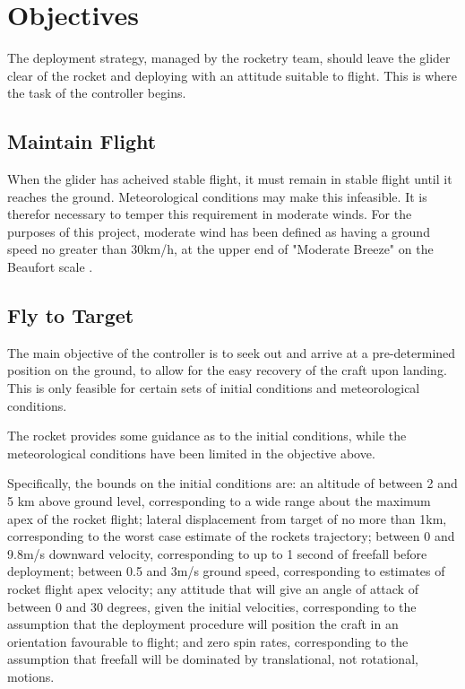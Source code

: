 \documentclass{sydeStyle}
\begin{document}
\chapter{Objectives}

The deployment strategy, managed by the rocketry team, should leave the glider
clear of the rocket and deploying with an attitude suitable to flight. This is
where the task of the controller begins.

\section{Maintain Flight}

When the glider has acheived stable flight, it must remain in stable flight
until it reaches the ground. Meteorological conditions may make this infeasible.
It is therefor necessary to temper this requirement in moderate winds. For the
purposes of this project, moderate wind has been defined as having a ground
speed no greater than 30km/h, at the upper end of "Moderate Breeze" on the
Beaufort scale \cite{wiki:beaufort}.

\section{Fly to Target}

The main objective of the controller is to seek out and arrive at a
pre-determined position on the ground, to allow for the easy recovery of the
craft upon landing. This is only feasible for certain sets of initial conditions
and meteorological conditions.

The rocket provides some guidance as to the initial conditions, while the
meteorological conditions have been limited in the objective above.

Specifically, the bounds on the initial conditions are: an altitude of between 2
and 5 km above ground level, corresponding to a wide range about the maximum
apex of the rocket flight; lateral displacement from target of no more than 1km,
corresponding to the worst case estimate of the rockets trajectory; between 0
and 9.8m/s downward velocity, corresponding to up to 1 second of freefall before
deployment; between 0.5 and 3m/s ground speed, corresponding to estimates
of rocket flight apex velocity; any attitude that will give an angle of attack
of between 0 and 30 degrees, given the initial velocities, corresponding to the
assumption that the deployment procedure will position the craft in an
orientation favourable to flight; and zero spin rates, corresponding to the
assumption that freefall will be dominated by translational, not rotational,
motions.
\end{document}
